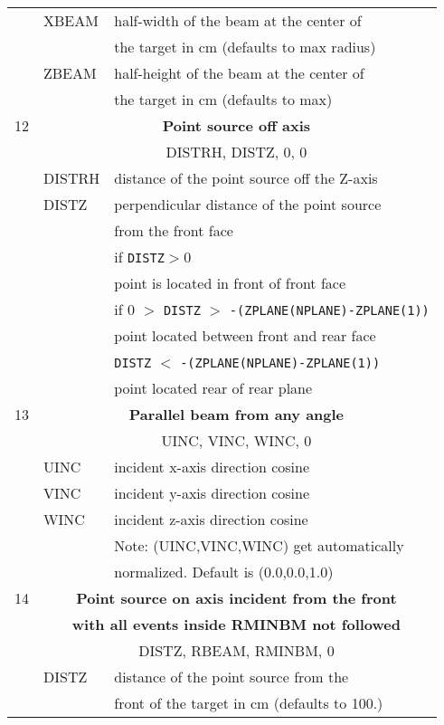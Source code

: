 \begin{longtable}{lll}
  &XBEAM    & half-width of the beam at the center of\\
  &                & the target in cm (defaults to max radius)\\
  &ZBEAM    & half-height of the beam at the center of\\
  &                & the target in cm (defaults to max)\\
\hline
12&\multicolumn{2}{c}{\bf Point source off axis}\\
  &\multicolumn{2}{c}{      DISTRH, DISTZ, 0, 0}\\
  &DISTRH   & distance of the point source off the Z-axis\\
  &DISTZ    & perpendicular distance of the point source\\
  &                & from the front face\\
  &          &if {\tt DISTZ}$>$0 \\
  &                & point is located in front of front face\\
  & & if 0 $>$ {\tt DISTZ} $>$ {\tt -(ZPLANE(NPLANE)-ZPLANE(1))}\\
  &                & point located between front and rear face\\
  & & {\tt DISTZ} $<$ {\tt -(ZPLANE(NPLANE)-ZPLANE(1))} \\
  &                & point located rear of rear plane \\
\hline
13&\multicolumn{2}{c}{\bf Parallel beam from any angle}\\
  &\multicolumn{2}{c}{      UINC, VINC, WINC, 0}\\
  & UINC    & incident x-axis direction cosine\\
  & VINC    & incident y-axis direction cosine\\
  & WINC    & incident z-axis direction cosine\\
  &         & Note: (UINC,VINC,WINC) get automatically\\
  &         & normalized. Default is (0.0,0.0,1.0)\\
\hline
14&\multicolumn{2}{c}{\bf Point source on axis incident from the front}\\
  &\multicolumn{2}{c}{\bf with all events inside RMINBM not followed} \\
  &\multicolumn{2}{c}{DISTZ, RBEAM, RMINBM, 0}\\
  & DISTZ   &  distance of the point source from the \\
  &         &  front of the target in cm (defaults to 100.)\\

\end{longtable}
